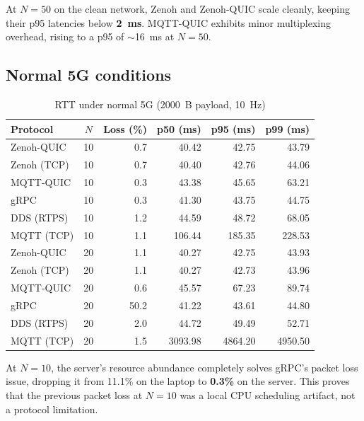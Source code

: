 \documentclass[11pt,a4paper]{article}
\begin{document}
At $N=50$ on the clean network, Zenoh and Zenoh-QUIC scale cleanly, keeping their p95 latencies below \textbf{2~ms}. MQTT-QUIC exhibits minor multiplexing overhead, rising to a p95 of $\sim$16~ms at $N=50$.

\subsection{Normal 5G conditions}

\begin{table}[H]
\centering
\caption{RTT under normal 5G (2000~B payload, 10~Hz)}
\label{tab:good5g}
\begin{tabular}{lcrrrr}
\toprule
Protocol & $N$ & Loss (\%) & p50 (ms) & p95 (ms) & p99 (ms) \\
\midrule
Zenoh-QUIC  & 10 & 0.7  & 40.42  & 42.75  & 43.79 \\
Zenoh (TCP) & 10 & 0.7  & 40.40  & 42.76  & 44.06 \\
MQTT-QUIC   & 10 & 0.3  & 43.38  & 45.65  & 63.21 \\
gRPC        & 10 & 0.3  & 41.30  & 43.75  & 44.75 \\
DDS (RTPS)  & 10 & 1.2  & 44.59  & 48.72  & 68.05 \\
MQTT (TCP)  & 10 & 1.1  & 106.44 & 185.35 & 228.53 \\
\midrule
Zenoh-QUIC  & 20 & 1.1  & 40.27  & 42.75  & 43.93 \\
Zenoh (TCP) & 20 & 1.1  & 40.27  & 42.73  & 43.96 \\
MQTT-QUIC   & 20 & 0.6  & 45.57  & 67.23  & 89.74 \\
gRPC        & 20 & 50.2 & 41.22  & 43.61  & 44.80 \\
DDS (RTPS)  & 20 & 2.0  & 44.72  & 49.49  & 52.71 \\
MQTT (TCP)  & 20 & 1.5  & 3093.98 & 4864.20 & 4950.50 \\
\bottomrule
\end{tabular}
\end{table}

At $N=10$, the server's resource abundance completely solves gRPC's packet loss issue, dropping it from 11.1\% on the laptop to \textbf{0.3\%} on the server. This proves that the previous packet loss at $N=10$ was a local CPU scheduling artifact, not a protocol limitation.
\end{document}
